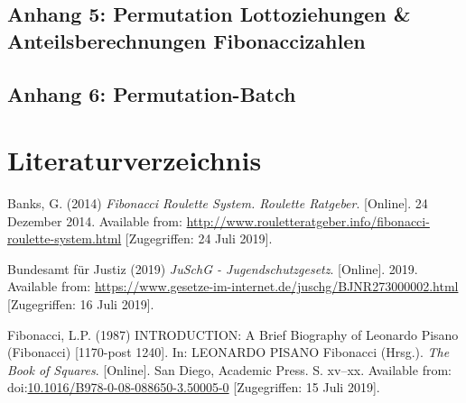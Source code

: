 \documentclass[ngerman,]{article}
\begin{document}
\begin{center}

\end{center}

\subsection{Anhang 5: Permutation Lottoziehungen \& Anteilsberechnungen
Fibonaccizahlen}\label{anhang-5-permutation-lottoziehungen-anteilsberechnungen-fibonaccizahlen}

\begin{center}

\end{center}

\subsection{Anhang 6:
Permutation-Batch}\label{anhang-6-permutation-batch}

\begin{center}

\end{center}

\section*{Literaturverzeichnis}\label{literaturverzeichnis}

\hypertarget{refs}{}
\hypertarget{ref-banks_fibonacci_2014}{}
Banks, G. (2014) \emph{Fibonacci Roulette System. Roulette Ratgeber}.
{[}Online{]}. 24 Dezember 2014. Available from:
\url{http://www.rouletteratgeber.info/fibonacci-roulette-system.html}
{[}Zugegriffen: 24 Juli 2019{]}.

\hypertarget{ref-bundesamt_fur_justiz_juschg_2019}{}
Bundesamt für Justiz (2019) \emph{JuSchG - Jugendschutzgesetz}.
{[}Online{]}. 2019. Available from:
\url{https://www.gesetze-im-internet.de/juschg/BJNR273000002.html}
{[}Zugegriffen: 16 Juli 2019{]}.

\hypertarget{ref-fibonacci_introduction:_1987}{}
Fibonacci, L.P. (1987) INTRODUCTION: A Brief Biography of Leonardo
Pisano (Fibonacci) {[}1170-post 1240{]}. In: LEONARDO PISANO Fibonacci
(Hrsg.). \emph{The Book of Squares}. {[}Online{]}. San Diego, Academic
Press. S. xv--xx. Available from:
doi:\href{https://doi.org/10.1016/B978-0-08-088650-3.50005-0}{10.1016/B978-0-08-088650-3.50005-0}
{[}Zugegriffen: 15 Juli 2019{]}.
\end{document}
